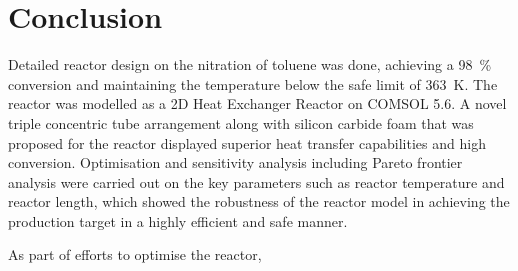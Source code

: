\section{Conclusion} \label{sec:conclusion}
Detailed reactor design on the nitration of toluene was done, achieving a \SI{98}{\%} conversion and maintaining the temperature below the safe limit of \SI{363}{\K}. The reactor was modelled as a 2D Heat Exchanger Reactor on COMSOL 5.6. A novel triple concentric tube arrangement along with silicon carbide foam that was proposed for the reactor displayed superior heat transfer capabilities and high conversion. Optimisation and sensitivity analysis including Pareto frontier analysis were carried out on the key parameters such as reactor temperature and reactor length, which showed the robustness of the reactor model in achieving the production target in a highly efficient and safe manner.  

As part of efforts to optimise the reactor, 

